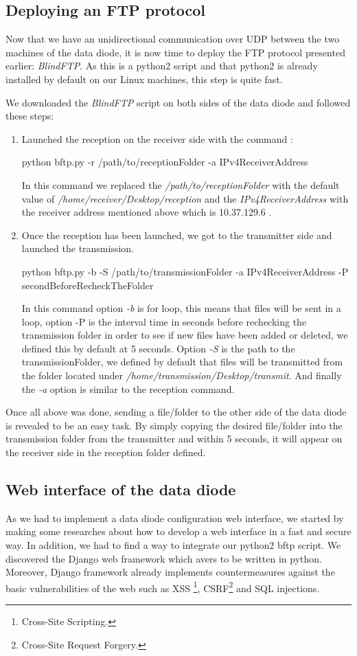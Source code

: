 \documentclass[a4paper,10pt]{article}
\begin{document}
\subsection{Deploying an FTP protocol}
Now that we have an unidirectional communication over UDP between the two machines of the data diode, it is now time to deploy the FTP protocol presented earlier: \emph{BlindFTP}. As this is a python2 script and that python2 is already installed by default on our Linux machines, this step is quite fast.

We downloaded the \emph{BlindFTP} script on both sides of the data diode and followed these steps:
\begin{enumerate}
\item Launched the reception on the receiver side with the command : 
\begin{center}
python bftp.py -r /path/to/receptionFolder -a IPv4ReceiverAddress
\end{center}
In this command we replaced the \emph{/path/to/receptionFolder} with the default value of \emph{/home/receiver/Desktop/reception} and the \emph{IPv4ReceiverAddress} with the receiver address mentioned above which is 10.37.129.6 .

\item Once the reception has been launched, we got to the transmitter side and launched the transmission.
\begin{center}
python bftp.py -b -S /path/to/transmissionFolder -a IPv4ReceiverAddress -P secondBeforeRecheckTheFolder
\end{center}
In this command option \emph{-b} is for loop, this means that files will be sent in a loop, option -P is the interval time in seconds before rechecking the transmission folder in order to see if new files have been added or deleted, we defined this by default at 5 seconds. Option \emph{-S} is the path to the transmissionFolder, we defined by default that files will be transmitted from the folder located under \emph{/home/transmission/Desktop/transmit}. And finally the \emph{-a} option is similar to the reception command.
\end{enumerate}

Once all above was done, sending a file/folder to the other side of the data diode is revealed to be an easy task. By simply copying the desired file/folder into the transmission folder from the transmitter and within 5 seconds, it will appear on the receiver side in the reception folder defined.

\subsection{Web interface of the data diode}
As we had to implement a data diode configuration web interface, we started by making some researches about how to develop a web interface in a fast and secure way. In addition, we had to find a way to integrate our python2 bftp script. We discovered the Django web framework which avers to be written in python. Moreover, Django framework already implements countermeasures against the basic vulnerabilities of the web such as XSS \footnote{Cross-Site Scripting.}, CSRF\footnote{Cross-Site Request Forgery.} and SQL injections.
\end{document}
